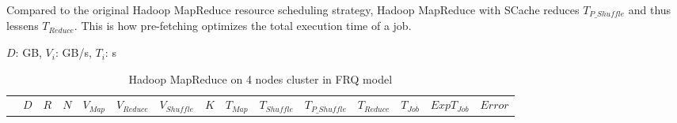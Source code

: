 {%


Compared to the original Hadoop MapReduce resource scheduling strategy, Hadoop MapReduce with SCache reduces \(T_{P\_Shuffle}\) and thus lessens \(T_{Reduce}\). This is how pre-fetching optimizes the total execution time of a job.


\begin{table}[!t]
\renewcommand{\arraystretch}{1.3}
\caption{\color{blue}Hadoop MapReduce on 4 nodes cluster in FRQ model}
\label{table1}
\centering
\(D\): GB, \(V_{i}\): GB/s, \(T_{i}\): s
\begin{tabular}{|c||c|c|c|c|c|c|c||c|c|c|c|c|c|c|}
\hline
 &
\(D\) &	
\(R\) &	
\(N\) &	
\(V_{Map}\) &	
\(V_{Reduce}\) &	
\(V_{Shuffle}\) &	
\(K\) &	
\(T_{Map}\) &	
\(T_{Shuffle}\) &	
\(T_{P\_Shuffle}\) &
\(T_{Reduce}\) & 
\(T_{Job}\) & 
\(Exp T_{Job}\) &
\(Error\)\\


\end{tabular}
\end{table}}
